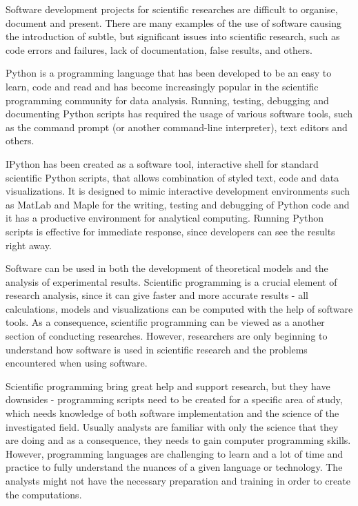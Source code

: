 Software development projects for scientific researches are difficult to organise, document and present. There are many examples of the use of software causing the introduction of subtle, but significant issues into scientific research, such as code errors and failures, lack of documentation, false results, and others. 

Python is a programming language that has been developed to be an easy to learn, code and read and has become increasingly popular in the scientific programming community for data analysis. Running, testing, debugging and documenting Python scripts has required the usage of various software tools, such as the command prompt (or another command-line interpreter), text editors and others. 

IPython has been created as a software tool, interactive shell for standard scientific Python scripts, that allows combination of styled text, code and data visualizations.\cite{mckinney2012python} It is designed to mimic interactive development environments such as MatLab \cite{matLab} and Maple \cite{maple} for  the writing, testing and debugging of Python code and it has a productive environment for analytical computing. \cite{mckinney2012python} Running Python scripts is effective for immediate response, since developers can see the results right away.

Software can be used in both the development of theoretical models and the analysis of experimental results. Scientific programming is a crucial element of research analysis, since it can give faster and more accurate results - all calculations, models and visualizations can be computed with the help of software tools. As a consequence, scientific programming can be viewed as a another section of conducting researches.\cite{johansson2014introduction} However, researchers are only beginning to understand how software is used in scientific research and the problems encountered when using software.

Scientific programming bring great help and support research, but they have downsides - programming scripts need to be created for a specific area of study, which needs knowledge of both software implementation and the science of the investigated field. Usually analysts are familiar with only the science that they are doing and as a consequence, they needs to gain computer programming skills. However, programming languages are challenging to learn and a lot of time and practice to fully understand the nuances of a given language or technology. The analysts might not have the necessary preparation and training in order to create the computations.  

